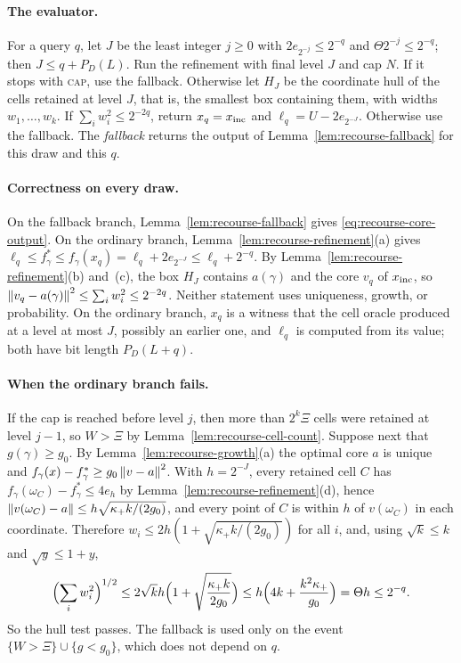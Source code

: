 \paragraph{The evaluator.}
For a query $q$, let $J$ be the least integer $j\ge0$ with
$2e_{2^{-j}}\le2^{-q}$ and $\Theta2^{-j}\le2^{-q}$; then
$J\le q+P_D(L)$. Run the refinement with final level $J$ and cap $N$.
If it stops with \textsc{cap}, use the fallback. Otherwise let $H_J$ be
the coordinate hull of the cells retained at level $J$, that is, the
smallest box containing them, with widths $w_1,\ldots,w_k$. If
$\sum_iw_i^2\le2^{-2q}$, return $x_q=x_{\rm inc}$ and
$\ell_q=U-2e_{2^{-J}}$. Otherwise use the fallback. The \emph{fallback}
returns the output of Lemma~\ref{lem:recourse-fallback} for this draw
and this $q$.

\paragraph{Correctness on every draw.}
On the fallback branch, Lemma~\ref{lem:recourse-fallback} gives
\eqref{eq:recourse-core-output}. On the ordinary branch,
Lemma~\ref{lem:recourse-refinement}(a) gives
$\ell_q\le f_\gamma^*\le f_\gamma(x_q)=\ell_q+2e_{2^{-J}}\le\ell_q+2^{-q}$.
By Lemma~\ref{lem:recourse-refinement}(b) and~(c), the box $H_J$
contains $a(\gamma)$ and the core $v_q$ of $x_{\rm inc}$, so
$\left\lVert v_q-a(\gamma)\right\rVert^2\le\sum_iw_i^2\le2^{-2q}$. Neither statement
uses uniqueness, growth, or probability. On the ordinary branch, $x_q$
is a witness that the cell oracle produced at a level at most $J$,
possibly an earlier one, and $\ell_q$ is computed from its value; both
have bit length $P_D(L+q)$.

\paragraph{When the ordinary branch fails.}
If the cap is reached before level $j$, then more than $2^k\Xi$ cells
were retained at level $j-1$, so $W>\Xi$ by
Lemma~\ref{lem:recourse-cell-count}. Suppose next that
$g(\gamma)\ge g_0$. By Lemma~\ref{lem:recourse-growth}(a) the optimal
core $a$ is unique and $f_\gamma(x)-f_\gamma^*\ge g_0\left\lVert v-a\right\rVert^2$. With
$h=2^{-J}$, every retained cell $C$ has
$f_\gamma(\omega_C)-f_\gamma^*\le4e_h$ by
Lemma~\ref{lem:recourse-refinement}(d), hence
$\left\lVert v(\omega_C)-a\right\rVert\le h\sqrt{\kappa_+k/(2g_0)}$, and every point of
$C$ is within $h$ of $v(\omega_C)$ in each coordinate. Therefore
$w_i\le2h(1+\sqrt{\kappa_+k/(2g_0)})$ for all $i$, and, using
$\sqrt k\le k$ and $\sqrt y\le1+y$,
\[
 \Bigl(\sum_iw_i^2\Bigr)^{1/2}\le2\sqrt kh\Bigl(1+\sqrt{\frac{\kappa_+k}{2g_0}}\Bigr)
 \le h\Bigl(4k+\frac{k^2\kappa_+}{g_0}\Bigr)=\Theta h\le2^{-q}.
\]
So the hull test passes. The fallback is used only on the event
$\{W>\Xi\}\cup\{g<g_0\}$, which does not depend on $q$.

